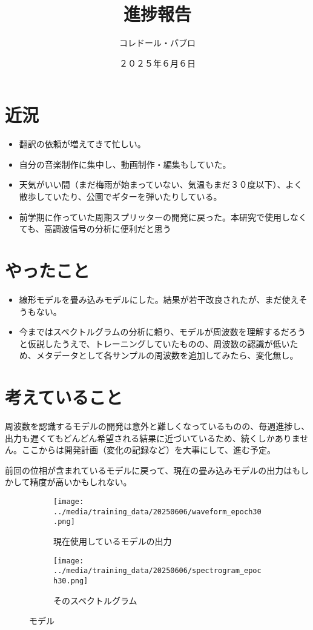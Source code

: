 \documentclass[a4paper, 12pt]{article}
\title{進捗報告}
\author{コレドール・パブロ}
\date{２０２５年６月６日}
\begin{document}
\maketitle

\section*{近況}
\begin{itemize}
    \item 翻訳の依頼が増えてきて忙しい。
    \item 自分の音楽制作に集中し、動画制作・編集もしていた。
    \item 天気がいい間（まだ梅雨が始まっていない、気温もまだ３０度以下）、よく散歩していたり、公園でギターを弾いたりしている。
    \item 前学期に作っていた周期スプリッターの開発に戻った。本研究で使用しなくても、高調波信号の分析に便利だと思う
\end{itemize} 

\section*{やったこと}
\begin{itemize}
    \item 線形モデルを畳み込みモデルにした。結果が若干改良されたが、まだ使えそうもない。
    \item 今まではスペクトルグラムの分析に頼り、モデルが周波数を理解するだろうと仮説したうえで、トレーニングしていたものの、周波数の認識が低いため、メタデータとして各サンプルの周波数を追加してみたら、変化無し。 
\end{itemize}

\section*{考えていること}

周波数を認識するモデルの開発は意外と難しくなっているものの、毎週進捗し、出力も遅くてもどんどん希望される結果に近づいているため、続くしかありません。ここからは開発計画（変化の記録など）を大事にして、進む予定。

前回の位相が含まれているモデルに戻って、現在の畳み込みモデルの出力はもしかして精度が高いかもしれない。

\begin{figure}
\centering
\begin{subfigure}{1.0\textwidth}
  \centering
  \texttt{[image: ../media/training\_data/20250606/waveform\_epoch30.png]}
  \caption{現在使用しているモデルの出力}
  \label{fig:0606modelWave}
\end{subfigure}
\vspace{5mm}
\begin{subfigure}{1.0\textwidth}
  \centering
  \texttt{[image: ../media/training\_data/20250606/spectrogram\_epoch30.png]}
  \caption{そのスペクトルグラム}
  \label{fig:0606modelSpectro}
\end{subfigure}
\caption{モデル}
\label{fig:0606Model}
\end{figure}
\end{document}
